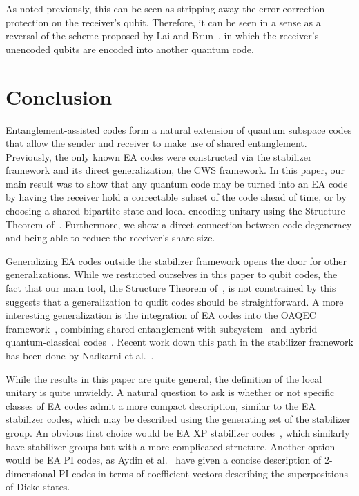 \documentclass[]{amsart}
\begin{document}
As noted previously, this can be seen as stripping away the error correction protection on the receiver's qubit.
Therefore, it can be seen in a sense as a reversal of the scheme proposed by Lai and Brun~\cite{LB2012}, in which the receiver's unencoded qubits are encoded into another quantum code.

\section{Conclusion}

Entanglement-assisted codes form a natural extension of quantum subspace codes that allow the sender and receiver to make use of shared entanglement.
Previously, the only known EA codes were constructed via the stabilizer framework and its direct generalization, the CWS framework.
In this paper, our main result was to show that any quantum code may be turned into an EA code by having the receiver hold a correctable subset of the code ahead of time, or by choosing a shared bipartite state and local encoding unitary using the Structure Theorem of~\cite{CHKNN2025}.
Furthermore, we show a direct connection between code degeneracy and being able to reduce the receiver's share size.

Generalizing EA codes outside the stabilizer framework opens the door for other generalizations.
While we restricted ourselves in this paper to qubit codes, the fact that our main tool, the Structure Theorem of~\cite{CHKNN2025}, is not constrained by this suggests that a generalization to qudit codes should be straightforward.
A more interesting generalization is the integration of EA codes into the OAQEC framework~\cite{BKK2007mar,BKK2007oct,DKV2024}, combining shared entanglement with subsystem~\cite{KLP2005,Pou2005} and hybrid quantum-classical codes~\cite{GLZ2017,NK2018,NK2021,NK2022}.
Recent work down this path in the stabilizer framework has been done by Nadkarni et al.~\cite{NADKV2024}.

While the results in this paper are quite general, the definition of the local unitary is quite unwieldy.
A natural question to ask is whether or not specific classes of EA codes admit a more compact description, similar to the EA stabilizer codes, which may be described using the generating set of the stabilizer group.
An obvious first choice would be EA XP stabilizer codes~\cite{WBB2022}, which similarly have stabilizer groups but with a more complicated structure.
Another option would be EA PI codes, as Aydin et al.~\cite{AAB2024} have given a concise description of 2-dimensional PI codes in terms of coefficient vectors describing the superpositions of Dicke states.
\end{document}
